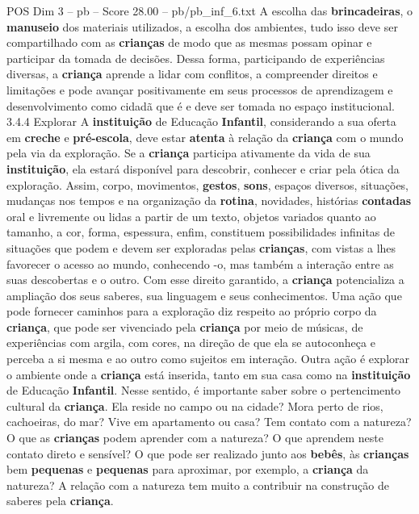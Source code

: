 \begin{textsample}{POS Dim 3 – pb – Score 28.00 – pb/pb\_inf\_6.txt}
A escolha das \textbf{brincadeiras}, o \textbf{manuseio} dos materiais utilizados, a escolha dos ambientes, tudo isso deve ser compartilhado com as \textbf{crianças} de modo que as mesmas possam opinar e participar da tomada de decisões.
Dessa forma, participando de experiências diversas, a \textbf{criança} aprende a lidar com conflitos, a compreender direitos e limitações e pode avançar positivamente em seus processos de aprendizagem e desenvolvimento como cidadã que é e deve ser tomada no espaço institucional. 3.4.4 Explorar A \textbf{instituição} de Educação \textbf{Infantil}, considerando a sua oferta em \textbf{creche} e \textbf{pré-escola}, deve estar \textbf{atenta} à relação da \textbf{criança} com o mundo pela via da exploração.
Se a \textbf{criança} participa ativamente da vida de sua \textbf{instituição}, ela estará disponível para descobrir, conhecer e criar pela ótica da exploração.
Assim, corpo, movimentos, \textbf{gestos}, \textbf{sons}, espaços diversos, situações, mudanças nos tempos e na organização da \textbf{rotina}, novidades, histórias \textbf{contadas} oral e livremente ou lidas a partir de um texto, objetos variados quanto ao tamanho, a cor, forma, espessura, enfim, constituem possibilidades infinitas de situações que podem e devem ser exploradas pelas \textbf{crianças}, com vistas a lhes favorecer o acesso ao mundo, conhecendo -o, mas também a interação entre as suas descobertas e o outro.
Com esse direito garantido, a \textbf{criança} potencializa a ampliação dos seus saberes, sua linguagem e seus conhecimentos.
Uma ação que pode fornecer caminhos para a exploração diz respeito ao próprio corpo da \textbf{criança}, que pode ser vivenciado pela \textbf{criança} por meio de músicas, de experiências com argila, com cores, na direção de que ela se autoconheça e perceba a si mesma e ao outro como sujeitos em interação.
Outra ação é explorar o ambiente onde a \textbf{criança} está inserida, tanto em sua casa como na \textbf{instituição} de Educação \textbf{Infantil}.
Nesse sentido, é importante saber sobre o pertencimento cultural da \textbf{criança}.
Ela reside no campo ou na cidade?
Mora perto de rios, cachoeiras, do mar?
Vive em apartamento ou casa?
Tem contato com a natureza?
O que as \textbf{crianças} podem aprender com a natureza?
O que aprendem neste contato direto e sensível?
O que pode ser realizado junto aos \textbf{bebês}, às \textbf{crianças} bem \textbf{pequenas} e \textbf{pequenas} para aproximar, por exemplo, a \textbf{criança} da natureza?
A relação com a natureza tem muito a contribuir na construção de saberes pela \textbf{criança}.

\end{textsample}

